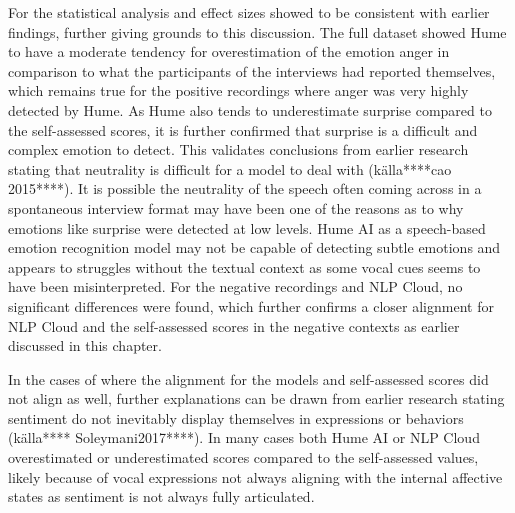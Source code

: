 For the statistical analysis and effect sizes showed to be consistent with earlier findings, further giving grounds to this discussion. 
The full dataset showed Hume to have a moderate tendency for overestimation of the emotion anger in comparison to what the participants of the interviews had reported themselves, which remains true for the positive recordings where anger was very highly detected by Hume. As Hume also tends to underestimate surprise compared to the self-assessed scores, it is further confirmed that surprise is a difficult and complex emotion to detect. This validates conclusions from earlier research stating that neutrality is difficult for a model to deal with (källa****cao 2015****). It is possible the neutrality of the speech often coming across in a spontaneous interview format may have been one of the reasons as to why emotions like surprise were detected at low levels. Hume AI as a speech-based emotion recognition model may not be capable of detecting subtle emotions and appears to struggles without the textual context as some vocal cues seems to have been misinterpreted.
For the negative recordings and NLP Cloud, no significant differences were found, which further confirms a closer alignment for NLP Cloud and the self-assessed scores in the negative contexts as earlier discussed in this chapter.

In the cases of where the alignment for the models and self-assessed scores did not align as well, further explanations can be drawn from earlier research stating sentiment do not inevitably display themselves in expressions or behaviors (källa**** Soleymani2017****). In many cases both Hume AI or NLP Cloud overestimated or underestimated scores compared to the self-assessed values, likely because of vocal expressions not always aligning with the internal affective states as sentiment is not always fully articulated. 
